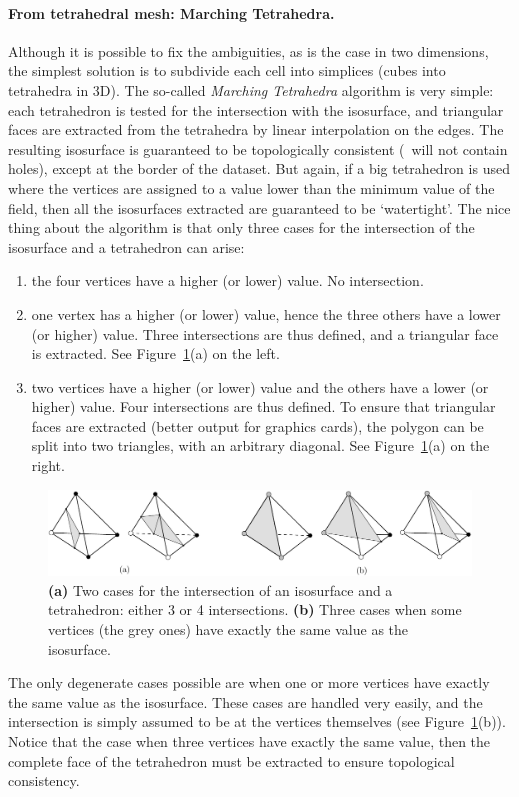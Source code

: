 \paragraph{From tetrahedral mesh: Marching Tetrahedra.} 
Although it is possible to fix the ambiguities, as is the case in two dimensions, the simplest solution is to subdivide each cell into simplices (cubes into tetrahedra in 3D). 
The so-called \emph{Marching Tetrahedra} algorithm is very simple: each tetrahedron is tested for the intersection with the isosurface, and triangular faces are extracted from the tetrahedra by linear interpolation on the edges. 
The resulting isosurface is guaranteed to be topologically consistent (\ie\ will not contain holes), except at the border of the dataset. 
But again, if a big tetrahedron is used where the vertices are assigned to a value lower than the minimum value of the field, then all the isosurfaces extracted are guaranteed to be `watertight'. 
The nice thing about the algorithm is that only three cases for the intersection of the isosurface and a tetrahedron can arise:
\begin{enumerate}
  \item the four vertices have a higher (or lower) value. No intersection.
  \item one vertex has a higher (or lower) value, hence the three others have a lower (or higher) value. Three intersections are thus defined, and a triangular face is extracted. See Figure~\ref{fig:isosurface_3cases}(a) on the left.
  \item two vertices have a higher (or lower) value and the others have a lower (or higher) value. Four intersections are thus defined. To ensure that triangular faces are extracted (better output for graphics cards), the polygon can be split into two triangles, with an arbitrary diagonal. See Figure~\ref{fig:isosurface_3cases}(a) on the right.
\end{enumerate}
\begin{figure}
  \centering
  \includegraphics[width=1.0\textwidth]{figs/isosurface_3cases}
  \caption{\textbf{(a)} Two cases for the intersection of an isosurface and a tetrahedron: either 3 or 4 intersections. \textbf{(b)} Three cases when some vertices (the grey ones) have exactly the same value as the isosurface.}%
\label{fig:isosurface_3cases}
\end{figure}
The only degenerate cases possible are when one or more vertices have exactly the same value as the isosurface. 
These cases are handled very easily, and the intersection is simply assumed to be at the vertices themselves (see Figure~\ref{fig:isosurface_3cases}(b)). 
Notice that the case when three vertices have exactly the same value, then the complete face of the tetrahedron must be extracted to ensure topological consistency.



